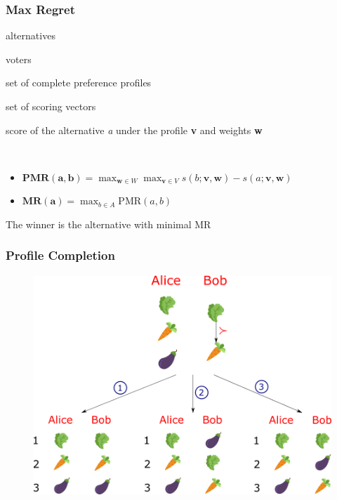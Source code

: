 \documentclass{beamer}
\begin{document}
\begin{frame}
	\frametitle{Max Regret}
		\begin{description} [$W=\{\mathbf{w}|\mathbf{w}=(w_1, \dots, w_m)\}$]
			\item [$A=\{a_1, \dots, a_m\}$] alternatives
			\item [$N=\{1, \dots, n\}$] voters
			\item [$V=\{\mathbf{v}|\mathbf{v}=(v_1, \dots, v_n)\}$] set of complete preference profiles
			\item [$W=\{\mathbf{w}|\mathbf{w}=(w_1, \dots, w_m)\}$] set of scoring vectors
			\item [$s(a;\mathbf{v},\mathbf{w})=\sum_{i \in N} \mathbf{w}_{\mathbf{v}_i(a)}$] score of the alternative \textit{a} under the profile \textbf{v} and weights \textbf{w}
		\end{description}~\\
	\begin{itemize}
		\item $\mathbf{\textbf{PMR}(a,b)}=\max_{\mathbf{w} \in W} \max_{\mathbf{v} \in V} s(b; \mathbf{v},\mathbf{w}) - s(a; \mathbf{v},\mathbf{w})$ 
		\item $\mathbf{\textbf{MR}(a)} = \max_{b \in A} \text{PMR}(a,b)$
	\end{itemize} 
	\begin{block}{}
		The winner is the alternative with minimal MR
	\end{block}
\end{frame}

\begin{frame}
\frametitle{Profile Completion}
\begin{figure}
	\includegraphics[scale=0.38]{completion.png}
\end{figure}
\end{frame}
\end{document}
